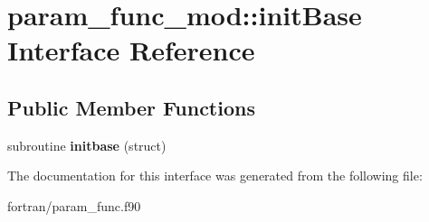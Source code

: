 \hypertarget{interfaceparam__func__mod_1_1init_base}{}\section{param\+\_\+func\+\_\+mod\+:\+:init\+Base Interface Reference}
\label{interfaceparam__func__mod_1_1init_base}
\subsection*{Public Member Functions}
\begin{DoxyCompactItemize}
\item 
\mbox{\label{interfaceparam__func__mod_1_1init_base_afb7467f931e884dfd8c7c255a750a571}} 
subroutine {\bfseries initbase} (struct)
\end{DoxyCompactItemize}


The documentation for this interface was generated from the following file\+:\begin{DoxyCompactItemize}
\item 
fortran/param\+\_\+func.\+f90\end{DoxyCompactItemize}
